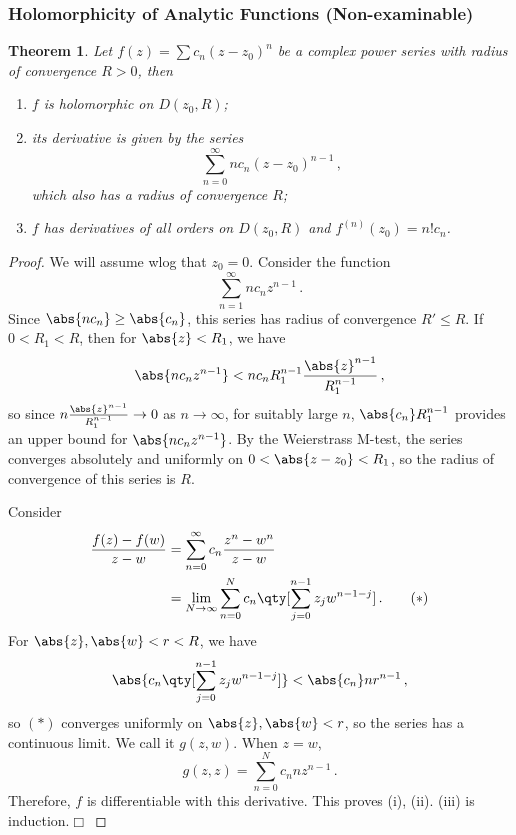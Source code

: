 \documentclass{article}
\theoremstyle{plain}\theoremheaderfont{\normalfont\itshape}\theorembodyfont{\rmfamily}\theoremseparator{.}\newtheorem*{rem}{Remark}\newtheorem*{ex}{Example}\newtheorem*{proof}{Proof}\newtheorem*{altp}{Alternative proof}
\theoremstyle{plain}\theoremheaderfont{\normalfont\bfseries}\theorembodyfont{\rmfamily}\theoremseparator{.}\newtheorem{thm}{Theorem}[section]\newtheorem{lem}[thm]{Lemma}\newtheorem{prop}[thm]{Proposition}\newtheorem*{cor}{Corollary}\newtheorem{defn}[thm]{Definition}\newtheorem{clm}[thm]{Claim}\newtheorem{clminproof}{Claim}
\theoremstyle{break}\theoremheaderfont{\normalfont\itshape}\theorembodyfont{\rmfamily}\theoremseparator{.\medskip}\newtheorem*{proofskip}{Proof}\newtheorem*{exs}{Examples}\newtheorem*{rems}{Remarks}
\theoremstyle{break}\theoremheaderfont{\normalfont\bfseries}\theorembodyfont{\rmfamily}\theoremseparator{.\medskip}\newtheorem{lemskip}[thm]{Lemma}\newtheorem{defnskip}[thm]{Definition}\newtheorem{propskip}[thm]{Proposition}\newtheorem{thmskip}[thm]{Theorem}
\numberwithin{equation}{section}
\newcommand{\qed}{\hfill\ensuremath{\Box}}
\begin{document}
	\subsubsection{Holomorphicity of Analytic Functions (Non-examinable)}
	\begin{thm}\label{anahol}
		Let \(f(z)=\sum c_n(z-z_0)^n\) be a complex power series with radius of convergence \(R>0\), then
		\begin{enumerate}[topsep=0pt]
			\item[(i)] \(f\) is holomorphic on \(D(z_0,R)\);
			\item[(ii)] its derivative is given by the series
			\[\sum_{n=0}^{\infty}nc_n(z-z_0)^{n-1}\,,\]
			which also has a radius of convergence \(R\);
			\item[(iii)] \(f\) has derivatives of all orders on \(D(z_0,R)\) and \(f^{(n)}(z_0)=n!c_n\).
		\end{enumerate}
	\end{thm}
	\begin{proof}
		We will assume wlog that \(z_0=0\). Consider the function
		\[\sum_{n=1}^{\infty}nc_nz^{n-1}\,.\]
		Since \(\abs{nc_n}\ge\abs{c_n}\), this series has radius of convergence \(R'\le R\). If \(0<R_1<R\), then for \(\abs{z}<R_1\), we have
		\[\abs{nc_nz^{n-1}}<nc_nR_1^{n-1}\frac{\abs{z}^{n-1}}{R_1^{n-1}}\,,\]
		so since \(n\frac{\abs{z}^{n-1}}{R_1^{n-1}}\to 0\) as \(n\to\infty\), for suitably large \(n\), \(\abs{c_n}R_1^{n-1}\) provides an upper bound for \(\abs{nc_nz^{n-1}}\). By the Weierstrass M-test, the series converges absolutely and uniformly on \(0<\abs{z-z_0}<R_1\), so the radius of convergence of this series is \(R\).

		Consider
		\begin{align}
			\frac{f(z)-f(w)}{z-w}&=\sum_{n=0}^{\infty}c_n\frac{z^n-w^n}{z-w}\nonumber\\
			&=\lim_{N\to\infty}\sum_{n=0}^{N}c_n\qty[\sum_{j=0}^{n-1}z_jw^{n-1-j}]\,. \tag{\(*\)}
		\end{align}
		For \(\abs{z},\abs{w}<r<R\), we have
		\[\abs{c_n\qty[\sum_{j=0}^{n-1}z_jw^{n-1-j}]}<\abs{c_n}nr^{n-1}\,,\]
		so \((*)\) converges uniformly on \(\abs{z},\abs{w}<r\), so the series has a continuous limit. We call it \(g(z,w)\). When \(z=w\),
		\[g(z,z)=\sum_{n=0}^{N}c_nnz^{n-1}\,.\]
		Therefore, \(f\) is differentiable with this derivative. This proves (i), (ii). (iii) is induction.\qed
	\end{proof}
\end{document}
